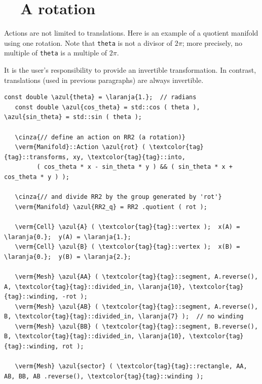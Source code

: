 \section{~~A rotation}\label{\numb section 7.\numb parag 14}

Actions are not limited to translations.
Here is an example of a quotient manifold using one rotation.
Note that {\small\tt theta} is not a divisor of $ 2\pi $;
more precisely, no multiple of {\small\tt theta} is a multiple of $ 2\pi $.

It is the user's responsibility to provide an invertible transformation.
In contrast, translations (used in previous paragraphs) are always invertible.

\begin{Verbatim}[commandchars=\\\{\},formatcom=\small\tt,frame=single,
   label=parag-\ref{\numb section 7.\numb parag 14}.cpp,rulecolor=\color{moldura},
   baselinestretch=0.94,framesep=2mm                                             ]
   const double \azul{theta} = \laranja{1.};  // radians
   const double \azul{cos_theta} = std::cos ( theta ), \azul{sin_theta} = std::sin ( theta );

   \cinza{// define an action on RR2 (a rotation)}
   \verm{Manifold}::Action \azul{rot} ( \textcolor{tag}{tag}::transforms, xy, \textcolor{tag}{tag}::into,
         ( cos_theta * x - sin_theta * y ) && ( sin_theta * x + cos_theta * y ) );

   \cinza{// and divide RR2 by the group generated by 'rot'}
   \verm{Manifold} \azul{RR2_q} = RR2 .quotient ( rot );

   \verm{Cell} \azul{A} ( \textcolor{tag}{tag}::vertex );  x(A) = \laranja{0.};  y(A) = \laranja{1.};
   \verm{Cell} \azul{B} ( \textcolor{tag}{tag}::vertex );  x(B) = \laranja{0.};  y(B) = \laranja{2.};

   \verm{Mesh} \azul{AA} ( \textcolor{tag}{tag}::segment, A.reverse(), A, \textcolor{tag}{tag}::divided_in, \laranja{10}, \textcolor{tag}{tag}::winding, -rot );
   \verm{Mesh} \azul{AB} ( \textcolor{tag}{tag}::segment, A.reverse(), B, \textcolor{tag}{tag}::divided_in, \laranja{7} );  // no winding
   \verm{Mesh} \azul{BB} ( \textcolor{tag}{tag}::segment, B.reverse(), B, \textcolor{tag}{tag}::divided_in, \laranja{10}, \textcolor{tag}{tag}::winding, rot );

   \verm{Mesh} \azul{sector} ( \textcolor{tag}{tag}::rectangle, AA, AB, BB, AB .reverse(), \textcolor{tag}{tag}::winding );
\end{Verbatim}

